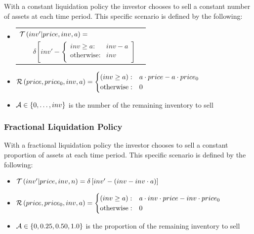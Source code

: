 With a constant liquidation policy the investor chooses to sell a constant number of assets at each time period. This specific scenario is defined by the following:
\begin{itemize}
    \item {\footnotesize 
         \begin{tabular}{ll}
            $ \mathcal{T}\left( inv' | price, inv, a \right) = $ & $ $ \\
            $ \qquad \delta \left[ inv' - \begin{cases}
            inv \geq a : & inv - a \\
            \text{otherwise} : & inv \\
            \end{cases} \right] $ & $ $\\
        \end{tabular}
    }%
    \item {\footnotesize $ \mathcal{R}\left(price, price_0, inv, a \right) =
        \begin{cases}
            (inv \geq a) : & a \cdot price - a \cdot price_0 \\
            \text{otherwise} : & 0 \\
        \end{cases} $}
    \item {\footnotesize $ \mathcal{A} \in \left\lbrace 0, \ldots, inv \right\rbrace $} is the number of the remaining inventory to sell    
\end{itemize}

\subsubsection{Fractional Liquidation Policy}
\label{sec:results_or_fractional}

With a fractional liquidation policy the investor chooses to sell a constant proportion of assets at each time period. This specific scenario is defined by the following:
\begin{itemize}
    \item {\footnotesize $\mathcal{T}\left( inv' | price, inv, n \right) = \delta \left[ inv' - (inv - inv \cdot a) \right] $}
    \item {\footnotesize $ \mathcal{R}\left(price, price_0, inv, a \right) =
        \begin{cases}
        (inv \geq a) : & a \cdot inv \cdot price - inv \cdot price_0 \\
        \text{otherwise} : & 0 \\
        \end{cases} $} 
    \item {\footnotesize $ \mathcal{A} \in \left\lbrace 0, 0.25, 0.50, 1.0 \right\rbrace $} is the proportion of the remaining inventory to sell    
\end{itemize}

